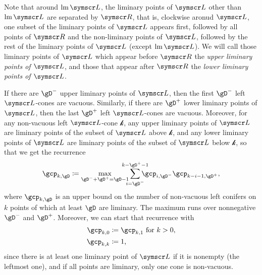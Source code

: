 \documentclass[10pt, a4paper, twoside]{basestyle}
\DeclareMathOperator{\leftmost}{lm}
\newcommand{\pointset}{\symscr}
\begin{document}
Note that around $\leftmost\pointset L$, the liminary points of $\pointset L$ other than
$\leftmost\pointset L$ are separated by
$\pointset R$, that is, clockwise aronud $\pointset L$, one subset of the liminary points of $\pointset L$ appears
first, followed by
all points of $\pointset R$ and the non-liminary points of $\pointset L$,
followed by the rest of the liminary points of $\pointset L$ (except $\leftmost\pointset L$).
We will call those liminary points of $\pointset L$ which appear before $\pointset R$ the \emph{upper
liminary points of $\pointset L$},
and those that appear after $\pointset R$ the \emph{lower liminary points of $\pointset L$}.

If there are $\gD^-$ upper liminary points of $\pointset L$, then the first $\gD^-$ left
$\pointset L$-cones are vacuous.
Similarly, if there are $\gD^+$ lower liminary points of $\pointset L$, then the last
$\gD^+$ left $\pointset L$-cones are vacuous. Moreover, for any non-vacuous left $\pointset L$-cone
$\mathscr{k}$, any upper liminary points
of $\pointset L$ are liminary points of the
subset of $\pointset L$ above $\mathscr{k}$, and any lower liminary points of $\pointset L$ are
liminary points of the
subset of $\pointset L$ below $\mathscr{k}$, so that we get the recurrence
\[\gcp_{k,\gD}\DefineAs\max_{\gD^-+\gD^+=\gD-1}\sum{i=\gD^-}[k-\gD^+-1]\gcp_{i,\gD^-}\gcp_{k-i-1,\gD^+}\text,\]
where $\gcp_{k,\gD}$ is an upper bound on the number of non-vacuous left conifers on $k$ points
of which at least $\gD$ are liminary. The maximum runs over nonnegative $\gD^-$ and $\gD^+$.
Moreover, we can start that recurrence with
\begin{align*}
\gcp_{k,0}&\DefineAs\gcp_{k,1}\text{ for $k>0$,}\\
\gcp_{k,k}&\DefineAs1\text,
\end{align*}
since there is at least one liminary point of $\pointset L$ if it is nonempty (the leftmost one), and if all
points are liminary, only one cone is non-vacuous.
\end{document}
